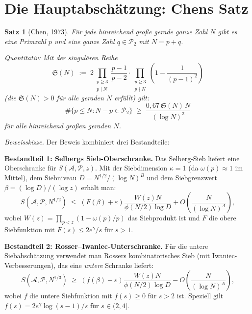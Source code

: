 \documentclass[12pt,a4paper]{amsart}
\newtheorem{theorem}{Satz}[section]
\theoremstyle{definition}
\newcommand{\Ptwo}{\mathcal{P}_2}
\begin{document}
\section{Die Hauptabschätzung: Chens Satz}

\begin{theorem}[Chen, 1973]\label{thm:chen}
  Für jede hinreichend große gerade ganze Zahl $N$ gibt es eine Primzahl
  $p$ und eine ganze Zahl $q \in \Ptwo$ mit $N = p + q$.

  Quantitativ: Mit der singulären Reihe
  \[
    \mathfrak{S}(N)
    \;:=\;
    2\prod_{\substack{p \geq 3 \\ p \mid N}}
    \frac{p-1}{p-2}
    \cdot
    \prod_{\substack{p \geq 3 \\ p \nmid N}}
    \left(1 - \frac{1}{(p-1)^2}\right)
  \]
  (die $\mathfrak{S}(N) > 0$ für alle geraden $N$ erfüllt) gilt:
  \[
    \#\bigl\{p \leq N : N-p \in \Ptwo\bigr\}
    \;\geq\;
    \frac{0{,}67\,\mathfrak{S}(N)\, N}{(\log N)^2}
  \]
  für alle hinreichend großen geraden $N$.
\end{theorem}

\textit{Beweisskizze.}  Der Beweis kombiniert drei Bestandteile:

\textbf{Bestandteil 1: Selbergs Sieb-Oberschranke.}
Das Selberg-Sieb liefert eine Oberschranke für $S(\mathcal{A},\mathcal{P},z)$.
Mit der Siebdimension $\kappa = 1$ (da $\omega(p) \approx 1$ im Mittel),
dem Siebniveau $D = N^{1/2}/(\log N)^B$ und dem Siebgrenzwert
$\beta = (\log D)/(\log z)$ erhält man:
\[
  S(\mathcal{A}, \mathcal{P}, N^{1/2})
  \;\leq\;
  (F(\beta) + \varepsilon)\frac{W(z) N}{\phi(N/2)\log D}
  + O\!\left(\frac{N}{(\log N)^A}\right),
\]
wobei $W(z) = \prod_{p < z}(1 - \omega(p)/p)$ das Siebprodukt ist und
$F$ die obere Siebfunktion mit $F(s) \leq 2e^\gamma/s$ für $s > 1$.

\textbf{Bestandteil 2: Rosser--Iwaniec-Unterschranke.}
Für die untere Siebabschätzung verwendet man Rossers kombinatorisches Sieb
(mit Iwaniec-Verbesserungen), das eine \emph{untere} Schranke liefert:
\[
  S(\mathcal{A}, \mathcal{P}, N^{1/3})
  \;\geq\;
  (f(\beta) - \varepsilon)\frac{W(z)N}{\phi(N/2)\log D}
  - O\!\left(\frac{N}{(\log N)^A}\right),
\]
wobei $f$ die untere Siebfunktion mit $f(s) \geq 0$ für $s > 2$ ist.
Speziell gilt $f(s) = 2e^\gamma \log(s-1)/s$ für $s \in (2, 4]$.
\end{document}
